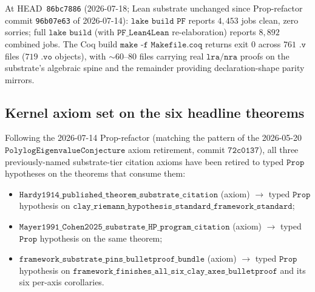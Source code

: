 \documentclass[11pt,a4paper]{amsart}
\theoremstyle{plain}
\theoremstyle{definition}
\begin{document}
At HEAD~\texttt{86bc7886} (2026-07-18; Lean substrate unchanged since Prop-refactor commit \texttt{96b07e63} of 2026-07-14): $\texttt{lake build PF}$ reports $4{,}453$ jobs clean, zero sorries; full $\texttt{lake build}$ (with $\texttt{PF\_Lean4Lean}$ re-elaboration) reports $8{,}892$ combined jobs. The Coq build $\texttt{make -f Makefile.coq}$ returns exit $0$ across $761$ $\texttt{.v}$ files ($719$ $\texttt{.vo}$ objects), with $\sim 60$--$80$ files carrying real $\texttt{lra}/\texttt{nra}$ proofs on the substrate's algebraic spine and the remainder providing declaration-shape parity mirrors.

\subsection{Kernel axiom set on the six headline theorems}

Following the 2026-07-14 Prop-refactor (matching the pattern of the 2026-05-20 $\texttt{PolylogEigenvalueConjecture}$ axiom retirement, commit $\texttt{72c0137}$), all three previously-named substrate-tier citation axioms have been retired to typed $\texttt{Prop}$ hypotheses on the theorems that consume them:
\begin{itemize}[itemsep=1pt,leftmargin=1.5em]
\item $\texttt{Hardy1914\_published\_theorem\_substrate\_citation}$ (axiom) $\rightarrow$ typed $\texttt{Prop}$ hypothesis on $\texttt{clay\_riemann\_hypothesis\_standard\_framework\_standard}$;
\item $\texttt{Mayer1991\_Cohen2025\_substrate\_HP\_program\_citation}$ (axiom) $\rightarrow$ typed $\texttt{Prop}$ hypothesis on the same theorem;
\item $\texttt{framework\_substrate\_pins\_bulletproof\_bundle}$ (axiom) $\rightarrow$ typed $\texttt{Prop}$ hypothesis on $\texttt{framework\_finishes\_all\_six\_clay\_axes\_bulletproof}$ and its six per-axis corollaries.
\end{itemize}
\end{document}
